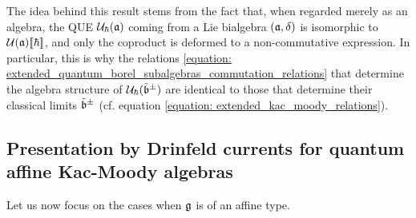         \begin{remark}
            The idea behind this result stems from the fact that, when regarded merely as an algebra, the QUE $\mathcal{U}_{\hbar}(\mathfrak{a})$ coming from a Lie bialgebra $(\mathfrak{a}, \delta)$ is isomorphic to $\mathcal{U}(\mathfrak{a})[\![\hbar]\!]$, and only the coproduct is deformed to a non-commutative expression. In particular, this is why the relations \eqref{equation: extended_quantum_borel_subalgebras_commutation_relations} that determine the algebra structure of $\mathcal{U}_{\hbar}(\tilde{\mathfrak{b}}^{\pm})$ are identical to those that determine their classical limits $\tilde{\mathfrak{b}}^{\pm}$ (cf. equation \eqref{equation: extended_kac_moody_relations}).
        \end{remark}

    \subsection{Presentation by Drinfeld currents for quantum affine Kac-Moody algebras}
        Let us now focus on the cases when $\mathfrak{g}$ is of an affine type.
        
